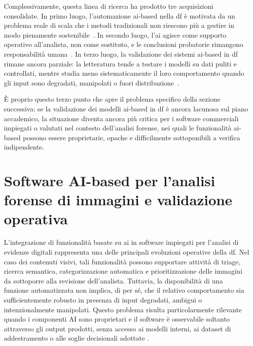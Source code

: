 Complessivamente, questa linea di ricerca ha prodotto tre acquisizioni consolidate. In primo luogo, l'automazione \gls{ai}-based nella \gls{df} è motivata da un problema reale di scala che i metodi tradizionali non riescono più a gestire in modo pienamente sostenibile~\cite{garfinkel2010digital,costantini2019digital}. In secondo luogo, l'\gls{ai} agisce come supporto operativo all'analista, non come sostituto, e le conclusioni probatorie rimangono responsabilità umana~\cite{faqir2023digital,sanna2025cybercrime}. In terzo luogo, la validazione dei sistemi \gls{ai}-based in \gls{df} rimane ancora parziale: la letteratura tende a testare i modelli su dati puliti e controllati, mentre studia meno sistematicamente il loro comportamento quando gli input sono degradati, manipolati o fuori distribuzione~\cite{sanna2024preliminary,sanna2025pixelperfect}.

È proprio questo terzo punto che apre il problema specifico della sezione successiva: se la validazione dei modelli \gls{ai}-based in \gls{df} è ancora lacunosa sul piano accademico, la situazione diventa ancora più critica per i software commerciali impiegati o valutati nel contesto dell'analisi forense, nei quali le funzionalità \gls{ai}-based possono essere proprietarie, opache e difficilmente sottoponibili a verifica indipendente.




\section{Software AI-based per l'analisi forense di immagini e validazione operativa}
\label{sec:sota-ai-tools}
L'integrazione di funzionalità basate su \gls{ai} in software impiegati per l'analisi di evidenze digitali rappresenta una delle principali evoluzioni operative della \gls{df}. Nel caso dei contenuti visivi, tali funzionalità possono supportare attività di triage, ricerca semantica, categorizzazione automatica e prioritizzazione delle immagini da sottoporre alla revisione dell'analista. Tuttavia, la disponibilità di una funzione automatizzata non implica, di per sé, che il relativo comportamento sia sufficientemente robusto in presenza di input degradati, ambigui o intenzionalmente manipolati. Questo problema risulta particolarmente rilevante quando i componenti AI sono proprietari e il software è osservabile soltanto attraverso gli output prodotti, senza accesso ai modelli interni, ai dataset di addestramento o alle soglie decisionali adottate \cite{costantini2019digital,sanna2024preliminary,sanna2025pixelperfect}.

